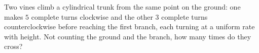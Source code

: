Two vines climb a cylindrical trunk from the same point on the ground: one makes $5$ complete turns clockwise and the other $3$ complete turns counterclockwise before reaching the first branch, each turning at a uniform rate with height. Not counting the ground and the branch, how many times do they cross?
